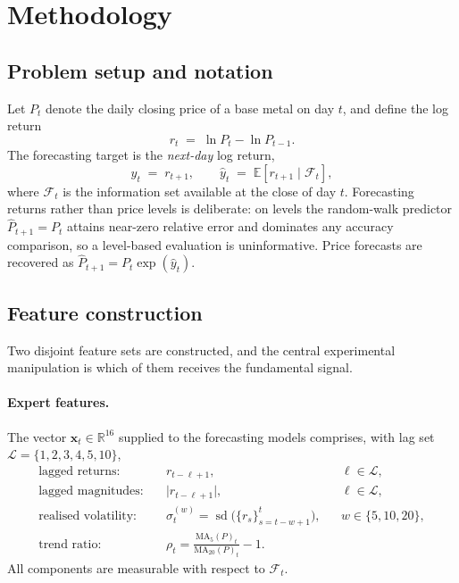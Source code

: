 %
%

\section{Methodology}

\subsection{Problem setup and notation}

Let $P_t$ denote the daily closing price of a base metal on day $t$, and define the
log return
\begin{equation}
r_t \;=\; \ln P_t - \ln P_{t-1}.
\end{equation}
The forecasting target is the \emph{next-day} log return,
\begin{equation}
y_t \;=\; r_{t+1},
\qquad
\hat{y}_t \;=\; \mathbb{E}\!\left[r_{t+1} \mid \mathcal{F}_t\right],
\end{equation}
where $\mathcal{F}_t$ is the information set available at the close of day $t$.
Forecasting returns rather than price levels is deliberate: on levels the
random-walk predictor $\hat{P}_{t+1}=P_t$ attains near-zero relative error and
dominates any accuracy comparison, so a level-based evaluation is uninformative.
Price forecasts are recovered as $\hat{P}_{t+1} = P_t \exp(\hat{y}_t)$.

\subsection{Feature construction}

Two disjoint feature sets are constructed, and the central experimental
manipulation is which of them receives the fundamental signal.

\paragraph{Expert features.} The vector $\bm{x}_t \in \mathbb{R}^{16}$ supplied to
the forecasting models comprises, with lag set $\mathcal{L}=\{1,2,3,4,5,10\}$,
\begin{align}
\text{lagged returns:}\quad & r_{t-\ell+1}, && \ell \in \mathcal{L},\\
\text{lagged magnitudes:}\quad & \lvert r_{t-\ell+1}\rvert, && \ell \in \mathcal{L},\\
\text{realised volatility:}\quad & \sigma^{(w)}_t = \operatorname{sd}\!\big(\{r_s\}_{s=t-w+1}^{t}\big), && w \in \{5,10,20\},\\
\text{trend ratio:}\quad & \rho_t = \frac{\mathrm{MA}_5(P)_t}{\mathrm{MA}_{20}(P)_t} - 1. &&
\end{align}
All components are measurable with respect to $\mathcal{F}_t$.

